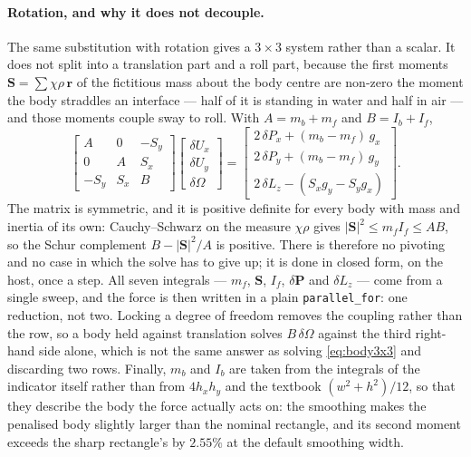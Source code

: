 \documentclass[11pt,a4paper]{article}
\newcommand{\code}[1]{\texttt{\small #1}}
\begin{document}
\paragraph{Rotation, and why it does not decouple.} The same substitution with
rotation gives a $3\times3$ system rather than a scalar. It does not split into a
translation part and a roll part, because the first moments
$\bm{S}=\sum\chi\rho\,\bm{r}$ of the fictitious mass about the body centre are
non-zero the moment the body straddles an interface --- half of it is standing in
water and half in air --- and those moments couple sway to roll. With
$A=m_b+m_f$ and $B=I_b+I_f$,
\begin{equation}
  \begin{bmatrix}
    A    & 0    & -S_y \\
    0    & A    &  S_x \\
    -S_y & S_x  &  B
  \end{bmatrix}
  \begin{bmatrix} \delta U_x \\ \delta U_y \\ \delta\Omega \end{bmatrix}
  =
  \begin{bmatrix}
    2\,\delta P_x + (m_b-m_f)\,g_x \\
    2\,\delta P_y + (m_b-m_f)\,g_y \\
    2\,\delta L_z - (S_x g_y - S_y g_x)
  \end{bmatrix}.
  \label{eq:body3x3}
\end{equation}
The matrix is symmetric, and it is positive definite for every body with mass and
inertia of its own: Cauchy--Schwarz on the measure $\chi\rho$ gives
$|\bm{S}|^2 \le m_f I_f \le AB$, so the Schur complement $B-|\bm{S}|^2/A$ is
positive. There is therefore no pivoting and no case in which the solve has to
give up; it is done in closed form, on the host, once a step. All seven integrals
--- $m_f$, $\bm{S}$, $I_f$, $\delta\bm{P}$ and $\delta L_z$ --- come from a single
sweep, and the force is then written in a plain \code{parallel\_for}: one
reduction, not two. Locking a degree of freedom removes the coupling rather than
the row, so a body held against translation solves $B\,\delta\Omega$ against the
third right-hand side alone, which is not the same answer as solving
\eqref{eq:body3x3} and discarding two rows. Finally, $m_b$ and $I_b$ are taken
from the integrals of the indicator itself rather than from $4h_xh_y$ and the
textbook $(w^2+h^2)/12$, so that they describe the body the force actually acts
on: the smoothing makes the penalised body slightly larger than the nominal
rectangle, and its second moment exceeds the sharp rectangle's by $2.55\%$ at the
default smoothing width.
\end{document}
